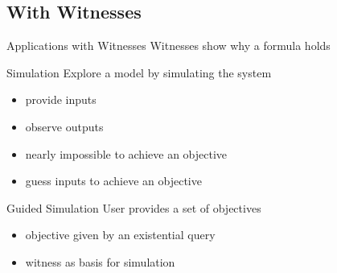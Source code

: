 \subsection{With Witnesses} 

\begin{frame}{Applications with Witnesses}
  Witnesses show why a formula holds
\end{frame}


\begin{frame}{Simulation}
  Explore a model by simulating the system
  \begin{itemize}
    \item provide inputs 
    \item observe outputs
  \end{itemize}
  
  \begin{itemize}
    \item nearly impossible to achieve an objective
    \item guess inputs to achieve an objective
  \end{itemize}
\end{frame}

\begin{frame}{Guided Simulation}
  User provides a set of objectives
  \begin{itemize}
    \item objective given by an existential query
    \item witness as basis for simulation
  \end{itemize}
\end{frame}

